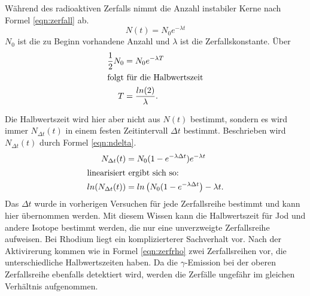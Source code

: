 Während des radioaktiven Zerfalls nimmt die Anzahl instabiler Kerne nach
Formel \eqref{eqn:zerfall} ab.
\begin{equation}
  N(t) = N_0 e^{-\lambda t}
  \label{eqn:zerfall}
\end{equation}
$N_0$ ist die zu Beginn vorhandene Anzahl und $\lambda$ ist die Zerfallskonstante.
Über
\begin{align}
  \frac{1}{2} N_0 &= N_0 e^{-\lambda T}\\
  \intertext{folgt für die Halbwertszeit}
  T &= \frac{ln(2)}{\lambda}.
  \label{eqn:HalbwertszeitSteigung}
\end{align}

Die Halbwertszeit wird hier aber nicht aus $N(t)$ bestimmt, sondern es wird immer
$N_{\Delta t}(t)$ in einem festen Zeitintervall $\Delta t$ bestimmt.
Beschrieben wird $N_{\Delta t}(t)$ durch Formel \eqref{eqn:ndelta}.
\begin{align}
  N_{\Delta t}(t) &= N_0(1 - e^{-\lambda\Delta t}) e^{-\lambda t} \label{eqn:ndelta}\\
  \intertext{linearisiert ergibt sich so:}
  ln(N_{\Delta t}(t)) &= ln\left( N_0(1-e^{-\lambda\Delta t}\right) - \lambda t \label{eqn:ndeltalinear}.
\end{align}
Das $\Delta t$ wurde in vorherigen Versuchen für jede Zerfallsreihe bestimmt und kann hier übernommen
werden. Mit diesem Wissen kann die Halbwertszeit für Jod und andere Isotope bestimmt werden,
die nur eine unverzweigte Zerfallsreihe aufweisen.
Bei Rhodium liegt ein komplizierterer Sachverhalt vor. Nach der Aktivirerung kommen
wie in Formel \eqref{eqn:zerfrho} zwei Zerfallsreihen vor, die unterschiedliche Halbwertszeiten
haben. Da die $\gamma$-Emission bei der oberen Zerfallsreihe ebenfalls detektiert wird,
werden die Zerfälle ungefähr im gleichen Verhältnis aufgenommen.

